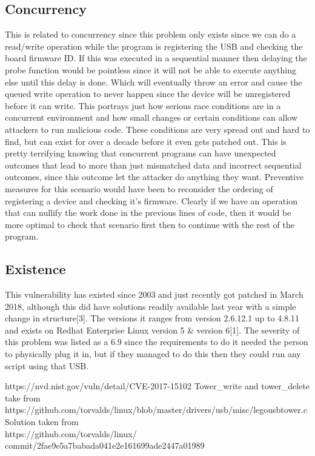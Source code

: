 \documentclass{article}
\begin{document}
\subsection{Concurrency}
This is related to concurrency since this problem only exists since we can do a read/write operation while the program is registering the USB and checking the board firmware ID. If this was executed in a sequential manner then delaying the probe function would be pointless since it will not be able to execute anything else until this delay is done. Which will eventually throw an error and cause the queued write operation to never happen since the device will be unregistered before it can write. This portrays just how serious race conditions are in a concurrent environment and how small changes or certain conditions can allow attackers to run malicious code. These conditions are very spread out and hard to find, but can exist for over a decade before it even gets patched out. This is pretty terrifying knowing that concurrent programs can have unexpected outcomes that lead to more than just mismatched data and incorrect sequential outcomes, since this outcome let the attacker do anything they want. Preventive measures for this scenario would have been to reconsider the ordering of registering a device and checking it's firmware. Clearly if we have an operation that can nullify the work done in the previous lines of code, then it would be more optimal to check that scenario first then to continue with the rest of the program.

\subsection{Existence}
This vulnerability has existed since 2003 and just recently got patched in March 2018, although this did have solutions readily available last year with a simple change in structure[3]. The versions it ranges from version 2.6.12.1 up to 4.8.11 and exists on Redhat Enterprise Linux version 5 \& version 6[1]. The severity of this problem was listed as a 6.9 since the requirements to do it needed the person to physically plug it in, but if they managed to do this then they could run any script using that USB\cite{NVD}.

\begin{thebibliography}{9}
	https://nvd.nist.gov/vuln/detail/CVE-2017-15102
	Tower\_write and tower\_delete take from\\ 
	https://github.com/torvalds/linux/blob/master/drivers/usb/misc/legousbtower.c
	Solution taken from\\
	https://github.com/torvalds/linux/\\commit/2fae9e5a7babada041e2e161699ade2447a01989
\end{thebibliography}
\end{document}
